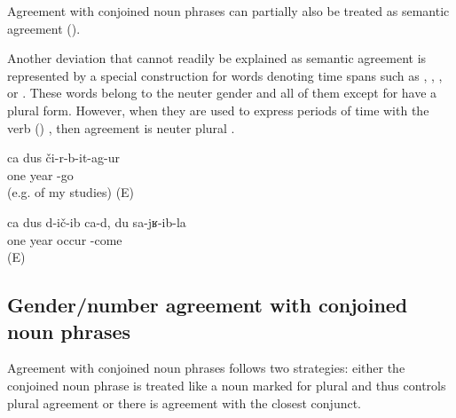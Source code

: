Agreement with conjoined noun phrases can partially also be treated as semantic agreement ().

Another deviation that cannot readily be explained as semantic agreement is represented by a special construction for words denoting time spans such as  ,  ,  , or  . These words belong to the neuter gender  and all of them except for  have a plural form. However, when they are used to express periods of time with the verb  () , then agreement is neuter plural .
%
\begin{exe}
	\ex	\label{ex:‎One year finished (e.g. of my studies)}
	\gll	ca	dus	či-r-b-it-ag-ur\\
		one	year	-go\\
	\glt	{} (e.g. of my studies) (E)

	\ex	\label{ex:‎One year passed by since I came here}
	\gll	ca	dus	d-ič-ib	ca-d,	du	sa-jʁ-ib-la\\
		one	year	occur			-come\\
	\glt	{} (E)
\end{exe}



\subsection{Gender/number agreement with conjoined noun phrases}
\label{ssec:Gender agreement resolution}

Agreement with conjoined noun phrases follows two strategies: either the conjoined noun phrase is treated like a noun marked for plural and thus controls plural agreement or there is agreement with the closest conjunct.

